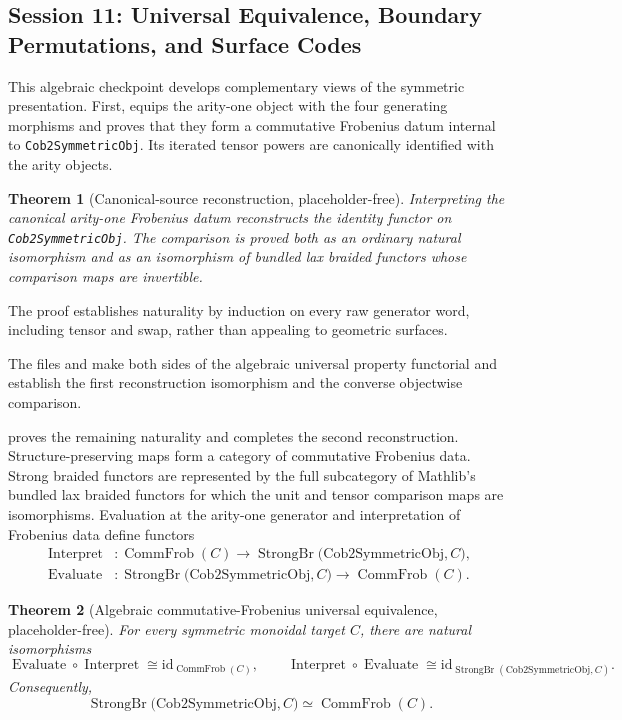 \documentclass[11pt]{amsart}
\theoremstyle{plain}
\newtheorem{theorem}{Theorem}[section]
\theoremstyle{definition}
\newcommand{\id}{\mathrm{id}}
\begin{document}
\subsection{Session 11: Universal Equivalence, Boundary Permutations, and Surface Codes}

This algebraic checkpoint develops complementary views of the symmetric presentation.  First,  equips the arity-one object with the four generating morphisms and proves that they form a commutative Frobenius datum internal to \texttt{Cob2SymmetricObj}.  Its iterated tensor powers are canonically identified with the arity objects.

\begin{theorem}[Canonical-source reconstruction, placeholder-free]
Interpreting the canonical arity-one Frobenius datum reconstructs the identity functor on \texttt{Cob2SymmetricObj}.  The comparison is proved both as an ordinary natural isomorphism and as an isomorphism of bundled lax braided functors whose comparison maps are invertible.
\end{theorem}

The proof establishes naturality by induction on every raw generator word, including tensor and swap, rather than appealing to geometric surfaces.

The files  and  make both sides of the algebraic universal property functorial and establish the first reconstruction isomorphism and the converse objectwise comparison.

 proves the remaining naturality and completes the second reconstruction. Structure-preserving maps form a category of commutative Frobenius data. Strong braided functors are represented by the full subcategory of Mathlib's bundled lax braided functors for which the unit and tensor comparison maps are isomorphisms. Evaluation at the arity-one generator and interpretation of Frobenius data define functors
\[
\begin{aligned}
\operatorname{Interpret} &: \operatorname{CommFrob}(C)\longrightarrow
  \operatorname{StrongBr}\bigl(\mathrm{Cob2SymmetricObj},C\bigr),\\
\operatorname{Evaluate} &: \operatorname{StrongBr}
  \bigl(\mathrm{Cob2SymmetricObj},C\bigr)
  \longrightarrow \operatorname{CommFrob}(C).
\end{aligned}
\]

\begin{theorem}[Algebraic commutative-Frobenius universal equivalence, placeholder-free]
For every symmetric monoidal target $C$, there are natural isomorphisms
\[
\operatorname{Evaluate}\circ\operatorname{Interpret}
\cong \id_{\operatorname{CommFrob}(C)},
\qquad
\operatorname{Interpret}\circ\operatorname{Evaluate}
\cong \id_{\operatorname{StrongBr}(\mathrm{Cob2SymmetricObj},C)}.
\]
Consequently,
\[
\operatorname{StrongBr}\bigl(\mathrm{Cob2SymmetricObj},C\bigr)
\simeq \operatorname{CommFrob}(C).
\]
\end{theorem}
\end{document}
